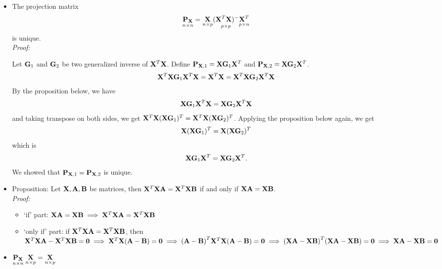 \begin{itemize}
	\item The projection matrix 
	$$
	\underset{n \times n}{\mathbf{P_X}}= \underset{n \times p}{\mathbf{X}} \underset{p \times p}{(\mathbf{X}^T \mathbf{X})^{-}}\underset{p \times n}{\mathbf{X}^T}
	$$
	is unique.\\
	{\it Proof:}
	\begin{pf}
		Let $\mathbf{G}_1$ and $\mathbf{G}_2$ be two generalized inverse of $\mathbf{X}^T\mathbf{X}$.
		Define $\mathbf{P}_{\mathbf{X}, 1} = \mathbf{X}\mathbf{G}_1 \mathbf{X}^T$ and $\mathbf{P}_{\mathbf{X}, 2} = \mathbf{X}\mathbf{G}_2 \mathbf{X}^T$.
		$$
		\mathbf{X}^T\mathbf{X}\mathbf{G}_1 \mathbf{X}^T\mathbf{X} = \mathbf{X}^T\mathbf{X} = \mathbf{X}^T\mathbf{X} \mathbf{G}_2 \mathbf{X}^T\mathbf{X}
		$$
		By the proposition below, we have
		$$
		\mathbf{X}\mathbf{G}_1 \mathbf{X}^T\mathbf{X} = \mathbf{X} \mathbf{G}_2 \mathbf{X}^T\mathbf{X}
		$$
		and taking transpose on both sides, we get $ \mathbf{X}^T\mathbf{X} (\mathbf{X}\mathbf{G}_1)^T = \mathbf{X}^T\mathbf{X} ( \mathbf{X} \mathbf{G}_2)^T$.
		Applying the proposition below again, we get
		$$
		\mathbf{X} (\mathbf{X}\mathbf{G}_1)^T = \mathbf{X} ( \mathbf{X} \mathbf{G}_2)^T
		$$
		which is
		$$
		\mathbf{X}\mathbf{G}_1 \mathbf{X}^T = \mathbf{X}\mathbf{G}_2 \mathbf{X}^T .
		$$
		We showed that $\mathbf{P}_{\mathbf{X}, 1} = \mathbf{P}_{\mathbf{X}, 2}$ is unique.
	\end{pf}
	\item Proposition: Let $\mathbf{X, A, B}$ be matrices, then $\mathbf{X}^T\mathbf{XA} = \mathbf{X}^T\mathbf{XB}$ if and only if $\mathbf{XA} = \mathbf{XB}$.\\
	{\it Proof:}
	\begin{pf}
		\begin{itemize}
			\item `if' part: $\mathbf{XA} = \mathbf{XB} \implies \mathbf{X}^T\mathbf{XA} = \mathbf{X}^T\mathbf{XB}$
			\item `only if' part: if $\mathbf{X}^T\mathbf{XA} = \mathbf{X}^T\mathbf{XB}$, then $\mathbf{X}^T\mathbf{XA} - \mathbf{X}^T\mathbf{XB} = \mathbf{0} \implies \mathbf{X}^T\mathbf{X(A - B)} = \mathbf{0} \implies \mathbf{(A - B)}^T \mathbf{X}^T\mathbf{X(A - B)} = \mathbf{0} \implies \mathbf{(XA - XB)}^T \mathbf{(XA - XB)} = \mathbf{0} \implies \mathbf{XA - XB = 0}$
		\end{itemize}
	\end{pf}
	\item $\underset{n \times n}{\mathbf{P_X}} \; \underset{n \times p}{\mathbf{X}} =  \underset{n \times p}{\mathbf{X}}$\\

\end{itemize}
